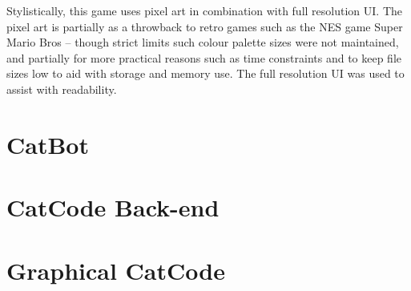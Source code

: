 Stylistically, this game uses pixel art in combination with full resolution UI. The pixel art is partially as a throwback to retro games such as the NES game Super Mario Bros \citep{SMB-NES} -- though strict limits such colour palette sizes were not maintained, and partially for more practical reasons such as time constraints and to keep file sizes low to aid with storage and memory use. The full resolution UI was used to assist with readability.

\section{CatBot}\label{sec:design/catBot}



\section{CatCode Back-end}\label{sec:design/catCodeBackend}



\pagebreak %

\section{Graphical CatCode}\label{sec:design/catCodeFrontend}




